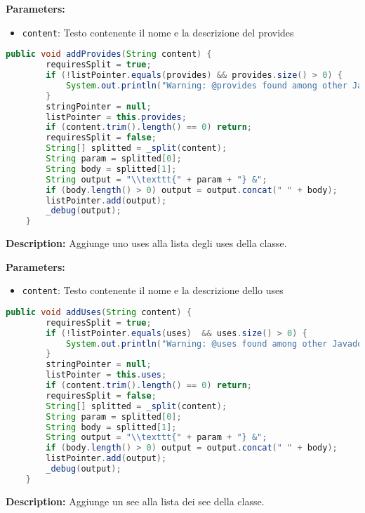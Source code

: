 \textbf{Parameters:}
\begin{itemize}
  \item\texttt{content}: Testo contenente il nome e la descrizione del provides  
\end{itemize}

\begin{lstlisting}[language=Java]
    public void addProvides(String content) {
        requiresSplit = true;
        if (!listPointer.equals(provides) && provides.size() > 0) {
            System.out.println("Warning: @provides found among other Javadoc keywords. You should put all @provides together.");
        }
        stringPointer = null;
        listPointer = this.provides;
        if (content.trim().length() == 0) return;
        requiresSplit = false;
        String[] splitted = _split(content);
        String param = splitted[0];
        String body = splitted[1];
        String output = "\\texttt{" + param + "} &";
        if (body.length() > 0) output = output.concat(" " + body);
        listPointer.add(output);
        _debug(output);
    }
\end{lstlisting}
\vspace{0.5cm}
\textbf{Description:}  Aggiunge uno uses alla lista degli uses della classe. 

\textbf{Parameters:}
\begin{itemize}
  \item\texttt{content}: Testo contenente il nome e la descrizione dello uses  
\end{itemize}

\begin{lstlisting}[language=Java]
    public void addUses(String content) {
        requiresSplit = true;
        if (!listPointer.equals(uses)  && uses.size() > 0) {
            System.out.println("Warning: @uses found among other Javadoc keywords. You should put all @uses together.");
        }
        stringPointer = null;
        listPointer = this.uses;
        if (content.trim().length() == 0) return;
        requiresSplit = false;
        String[] splitted = _split(content);
        String param = splitted[0];
        String body = splitted[1];
        String output = "\\texttt{" + param + "} &";
        if (body.length() > 0) output = output.concat(" " + body);
        listPointer.add(output);
        _debug(output);
    }
\end{lstlisting}
\vspace{0.5cm}
\textbf{Description:}  Aggiunge un see alla lista dei see della classe. 

